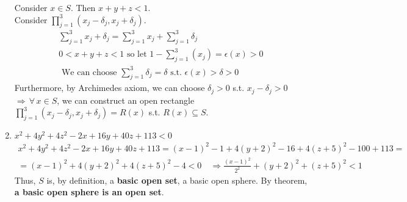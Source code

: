 \documentclass[twoside]{amsart}
\theoremstyle{plain}
\theoremstyle{definition}
\begin{document}
\begin{enumerate}
Consider $x \in S$.  Then $x+y+z <1$.  \\
Consider $\prod_{j=1}^3 (x_j - \delta_j, x_j+\delta_j)$.  
\[
\begin{gathered}
  \sum_{j=1}^3 x_j + \delta_j = \sum_{j=1}^3 x_j + \sum_{j=1}^3 \delta_j \\
  0 < x + y + z < 1 \text{ so let } 1 - \sum_{j=1}^3 (x_j) = \epsilon(x) > 0 \\
    \text{ We can choose } \sum_{j=1}^3 \delta_j = \delta \text{ s.t. } \epsilon(x) > \delta > 0 
\end{gathered}
\]
Furthermore, by Archimedes axiom, we can choose $\delta_j >0$ s.t. $x_j - \delta_j >0$ \\
$\Longrightarrow \, \forall \, x \in S$, we can construct an open rectangle $\prod_{j=1}^3 (x_j-\delta_j, x_j+ \delta_j) = R(x)$ s.t. $R(x) \subseteq S$.
\item $x^2 +4y^2 +4z^2 - 2x + 16y + 40z + 113 < 0$
\[
\begin{gathered}
  x^2 + 4 y^2 + 4 z^2 - 2x + 16y + 40 z + 113 = (x-1)^2 -1 + 4 (y+2)^2-16 + 4(z+5)^2 - 100 + 113 = \\
   = (x-1)^2 + 4(y+2)^2 +4 (z+5)^2 -4 < 0 \quad   \Longrightarrow \frac{ (x-1)^2 }{2^2 } + (y+2)^2 + (z+5)^2 < 1 
\end{gathered}
\]
Thus, $S$ is, by definition, a \textbf{basic open set}, a basic open sphere.  By theorem, \textbf{a basic open sphere is an open set}.
\end{enumerate}
\end{document}

